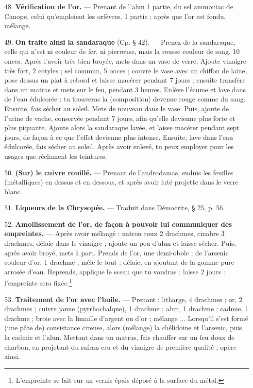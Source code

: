 \documentclass[a4paper, 11pt, oneside, polutonikogreek, french]{article}
\begin{document}
48. \textbf{Vérification de l'or.} --- Prenant de l'alun 1 partie, du sel ammoniac de Canope, celui qu'emploient les orfèvres, 1 partie ; après que l'or est fondu, mélange.

49. \textbf{On traite ainsi la sandaraque} (Cp. § 42). --- Prenez de la sandaraque, celle qui n'est ni couleur de fer, ni pierreuse, mais la rousse couleur de sang, 10 onces. Après l'avoir très bien broyée, mets dans un vase de verre. Ajoute vinaigre très fort, 2 cotyles ; sel commun, 5 onces ; couvre le vase avec un chiffon de laine, pose dessus un plat à rebord et laisse macérer pendant 7 jours ; ensuite transfère dans un matras et mets sur le feu, pendant 3 heures. Enlève l'écume et lave dans de l'eau édulcorée : tu trouveras la (composition) devenue rouge comme du sang. Ensuite, fais sécher au soleil. Mets de nouveau dans le vase. Puis, ajoute de l'urine de vache, conservée pendant 7 jours, afin qu'elle devienne plus forte et plus piquante. Ajoute alors la sandaraque lavée, et laisse macérer pendant sept jours, de façon à ce que l'effet devienne plus intense. Ensuite, lave dans l'eau édulcorée, fais sécher au soleil. Après avoir enlevé, tu peux employer pour les usages que réclament les teintures.

50. \textbf{(Sur) le cuivre rouillé.} --- Prenant de l'androdamas, enduis les feuilles (métalliques) en dessus et en dessous, et après avoir luté projette dans le verre blanc.

51. \textbf{Liqueurs de la Chrysopée.} --- Traduit dans Démocrite, § 25, p. 56.

52. \textbf{Amollissement de l'or, de façon à pouvoir lui communiquer des empreintes.} --- Après avoir mélangé : natron roux 2 drachmes, cinabre 3 drachmes, délaie dans le vinaigre ; ajoute un peu d'alun et laisse sécher. Puis, après avoir broyé, mets à part. Prends de l'or, une demi-obole ; de l'arsenic couleur d'or, 1 drachme ; mêle le tout ; délaie, en ajoutant de la gomme pure arrosée d'eau. Reprends, applique le sceau que tu voudras ; laisse 2 jours : l'empreinte sera fixée.\footnote{L'empreinte se fait sur un vernis épais déposé à la surface du métal.}

53. \textbf{Traitement de l'or avec l'huile.} --- Prenant : litharge, 4 drachmes ; or, 2 drachmes ; cuivre jaune (pyrrhochalque), 1 drachme ; alun, 1 drachme ; cadmie, 1 drachme ; broie avec la limaille d'argent ou d'or ; mélange ... Lorsqu'il s'est formé (une pâte de) consistance cireuse, alors (mélange) la chélidoine et l'arsenic, puis la cadmie et l'alun. Mettant dans un matras, fais chauffer sur un feu doux de charbon, en projetant du safran cru et du vinaigre de première qualité ; opère ainsi.
\end{document}
